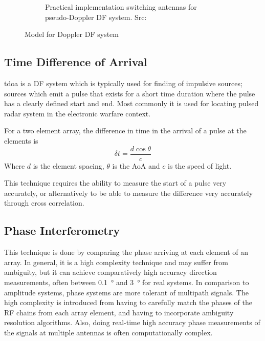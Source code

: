 \begin{figure}
\begin{subfigure}[b]{0.48\textwidth}
    \caption{Practical implementation switching antennas for pseudo-Doppler DF system. Src: \cite{jenkins1991smallaperture}}
  \end{subfigure}
  \caption{Model for Doppler DF system}
  \label{fig:lit-review-doppler-switching}
\end{figure}


\subsection{Time Difference of Arrival}
\gls{tdoa} is a DF system which is typically used for finding of impulsive sources; sources which emit a pulse that exists for a short time duration where the pulse has a clearly defined start and end. Most commonly it is used for locating pulsed radar system in the electronic warfare context.

For a two element array, the difference in time in the arrival of a pulse at the elements is
\begin{equation}
  \delta t = \frac{d \cos \theta}{c}
\end{equation}
Where \(d\) is the element spacing, \(\theta\) is the AoA and \(c\) is the speed of light.

This technique requires the ability to measure the start of a pulse very accurately, or alternatively to be able to measure the difference very accurately through cross correlation. 

\subsection{Phase Interferometry}
This technique is done by comparing the phase arriving at each element of an array.
In general, it is a high complexity technique and may suffer from ambiguity, but it can achieve comparatively high accuracy direction measurements, often between \SI{0.1}{\degree} and \SI{3}{\degree} for real systems. 
In comparison to amplitude systems, phase systems are more tolerant of multipath signals. 
The high complexity is introduced from having to carefully match the phases of the RF chains from each array element, and having to incorporate ambiguity resolution algorithms. Also, doing real-time high accuracy phase measurements of the signals at multiple antennas is often computationally complex. 

